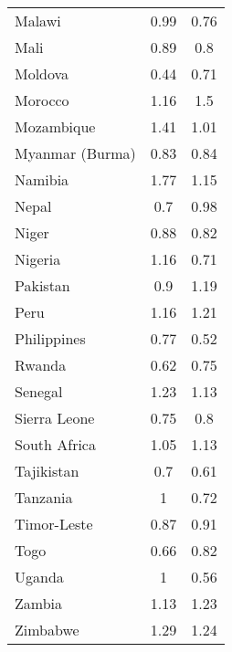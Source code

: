 \begin{tabular}{lcc}
 Malawi & 0.99 & 0.76 \\ 
 Mali & 0.89 & 0.8 \\ 
 Moldova & 0.44 & 0.71 \\ 
 Morocco & 1.16 & 1.5 \\ 
 Mozambique & 1.41 & 1.01 \\ 
 Myanmar (Burma) & 0.83 & 0.84 \\ 
 Namibia & 1.77 & 1.15 \\ 
 Nepal & 0.7 & 0.98 \\ 
 Niger & 0.88 & 0.82 \\ 
 Nigeria & 1.16 & 0.71 \\ 
 Pakistan & 0.9 & 1.19 \\ 
 Peru & 1.16 & 1.21 \\ 
 Philippines & 0.77 & 0.52 \\ 
 Rwanda & 0.62 & 0.75 \\ 
 Senegal & 1.23 & 1.13 \\ 
 Sierra Leone & 0.75 & 0.8 \\ 
 South Africa & 1.05 & 1.13 \\ 
 Tajikistan & 0.7 & 0.61 \\ 
 Tanzania & 1 & 0.72 \\ 
 Timor-Leste & 0.87 & 0.91 \\ 
 Togo & 0.66 & 0.82 \\ 
 Uganda & 1 & 0.56 \\ 
 Zambia & 1.13 & 1.23 \\ 
 Zimbabwe & 1.29 & 1.24 \\ 
 \hline 
\end{tabular}